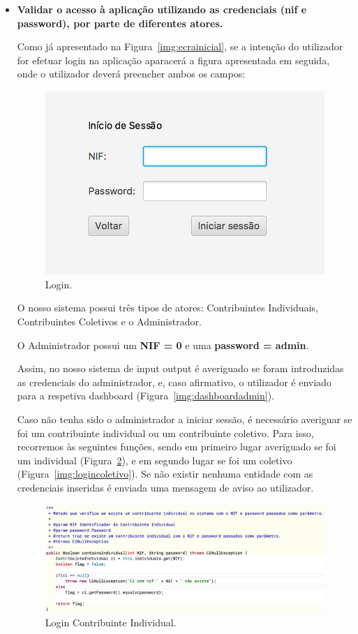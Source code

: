\documentclass[a4paper]{article}
\begin{document}
\begin{itemize}
\item \textbf{Validar o acesso à aplicação utilizando as credenciais (nif e password), por parte
de diferentes atores.}

Como já apresentado na Figura~\ref{img:ecrainicial}, se a intenção do utilizador
for efetuar login na aplicação aparacerá a figura apresentada em seguida, onde o
utilizador deverá preencher ambos os campos:

\begin{figure}[H]
\centering
\includegraphics[scale=0.40]{imgs/login.png}
\caption{Login.}
\label{img:login}
\end{figure}

O nosso sistema possui três tipos de atores: Contribuintes
Individuais, Contribuintes Coletivos e o Administrador.

O Administrador possui um \textbf{NIF = 0} e uma \textbf{password = admin}.

Assim, no nosso sistema de input output é averiguado se foram introduzidas as
credenciais do administrador, e, caso afirmativo, o utilizador é enviado para a
respetiva dashboard (Figura~\ref{img:dashboardadmin}).

Caso não tenha sido o administrador a iniciar sessão, é necessário averiguar se
foi um contribuinte individual ou um contribuinte coletivo. Para isso, recorremos
às seguintes funções, sendo em primeiro lugar averiguado se foi um individual
(Figura~\ref{img:loginindividual}), e em segundo lugar se foi um coletivo
(Figura~\ref{img:logincoletivo}). Se não existir nenhuma entidade com as credenciais
inseridas é enviada uma mensagem de aviso ao utilizador.

\begin{figure}[H]
\centering
\includegraphics[scale=0.40]{imgs/loginindividual.png}
\caption{Login Contribuinte Individual.}
\label{img:loginindividual}
\end{figure}


\end{itemize}
\end{document}
